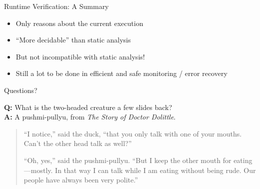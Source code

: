 \documentclass[12pt]{beamer}
\begin{document}
\begin{frame}{Runtime Verification: \small A Summary}
  \begin{itemize}
    \item<1-> Only reasons about the current execution
    \item<1-> ``More decidable'' than static analysis
    \item<2-> But not incompatible with static analysis!
    \item<3-> Still a lot to be done in efficient and safe monitoring
      / error recovery
  \end{itemize}
\end{frame}

\begin{frame}{Questions?}
  \vspace{4.5cm}

  \footnotesize
  \textbf{Q:} What is the two-headed creature a few slides back?\\
  \textbf{A:} A pushmi-pullyu, from \textit{The Story of Doctor Dolittle}.

  \begin{quote}
    ``I notice,'' said the duck, ``that you only talk with one of your
    mouths. Can't the other head talk as well?''

    ``Oh, yes,'' said the pushmi-pullyu. ``But I keep the other mouth
    for eating---mostly. In that way I can talk while I am eating
    without being rude. Our people have always been very polite.''
  \end{quote}
\end{frame}
\end{document}
